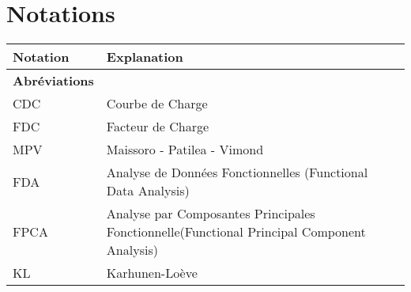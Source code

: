 \section*{Notations}
\thispagestyle{empty}
\begin{tabularx}{\textwidth}{lX}
	\toprule
	\textbf{Notation}                                                & \textbf{Explanation}                                                                                                                                                                                       \\
	\midrule
	\textbf{Abréviations}                                                                                                                                                                                                                                                         \\
	\midrule
	CDC                                                              & Courbe de Charge                                                                                                                                                                                           \\
	FDC                                                              & Facteur de Charge                                                                                                                                                                                          \\
	MPV                                                              & Maissoro - Patilea - Vimond                                                                                                                                                                                \\
	FDA                                                              & Analyse de Données Fonctionnelles (Functional Data Analysis)                                                                                                                                               \\
	FPCA                                                             & Analyse par Composantes Principales Fonctionnelle(Functional Principal Component Analysis)                                                                                                                 \\
	KL                                                               & Karhunen-Loève                                                                                                                                                                                             \\

\end{tabularx}
